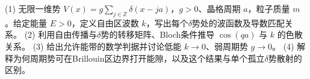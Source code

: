 (1) 无限一维势 \(V(x)=g\sum_{j\in\mathbb Z}\delta(x-ja)\)，\(g>0\)、晶格周期 \(a\)，粒子质量 \(m\)。给定能量 \(E>0\)，定义自由区波数 \(k\)，写出每个\(\delta \)势处的波函数及导数匹配关系。
(2) 利用自由传播与\(\delta \)势的转移矩阵、Bloch条件推导 \(\cos(qa)\) 与 \(k\) 的色散关系。
(3) 给出允许能带的数学判据并讨论低能 \(k\to0\)、弱周期势 \(g\to0\)。
(4) 解释为何周期势可在Brillouin区边界打开能隙，以及这个结果与单个孤立\(\delta \)势散射的区别。
